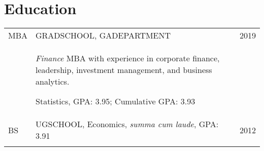 \documentclass[a4paper,10pt]{article}
\begin{document}
\section{Education}
\begin{supertabular}{p{1.5cm}p{13.9cm}>{\raggedleft\arraybackslash}p{1.5cm}}
	\textsc{MBA} & \textsc{GRADSCHOOL}, \small GADEPARTMENT
	& 	\textsc{2019} \\
	& \begin{enumerate*}[label =$\circ$, itemjoin={\newline}]
	\item \footnotesize \emph{Finance} MBA with experience in corporate finance, leadership, investment management, and business analytics.
	\item \small Statistics, GPA: 3.95; Cumulative GPA: 3.93
	\end{enumerate*}
	& \\
	\textsc{BS} & \textsc{UGSCHOOL}, \small Economics, \emph{summa cum laude}, GPA: 3.91
	&	\textsc{2012} 	\\
	 \\
\end{supertabular}



\smallskip
\end{document}
